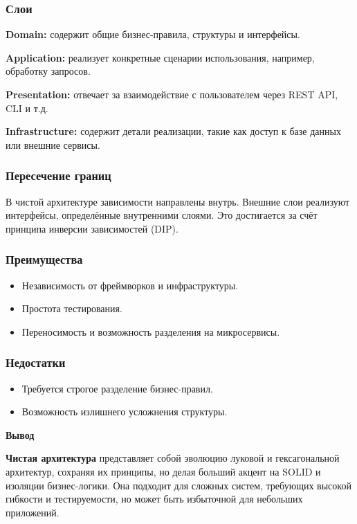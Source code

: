 \subsubsection{Слои}
\textbf{Domain:} содержит общие бизнес-правила, структуры и интерфейсы.

\textbf{Application:} реализует конкретные сценарии использования, например, обработку запросов.

\textbf{Presentation:} отвечает за взаимодействие с пользователем через REST API, CLI и т.д.

\textbf{Infrastructure:} содержит детали реализации, такие как доступ к базе данных или внешние сервисы.

\subsubsection{Пересечение границ}
В чистой архитектуре зависимости направлены внутрь. Внешние слои реализуют интерфейсы, определённые внутренними слоями. Это достигается за счёт принципа инверсии зависимостей (DIP).

\subsubsection{Преимущества}
\begin{itemize}
    \item Независимость от фреймворков и инфраструктуры.
    \item Простота тестирования.
    \item Переносимость и возможность разделения на микросервисы.
\end{itemize}

\subsubsection{Недостатки}
\begin{itemize}
    \item Требуется строгое разделение бизнес-правил.
    \item Возможность излишнего усложнения структуры.
\end{itemize}


\textbf{Вывод}


\textbf{Чистая архитектура} представляет собой эволюцию луковой и гексагональной архитектур, сохраняя их принципы, но делая больший акцент на SOLID и изоляции бизнес-логики. Она подходит для сложных систем, требующих высокой гибкости и тестируемости, но может быть избыточной для небольших приложений.


